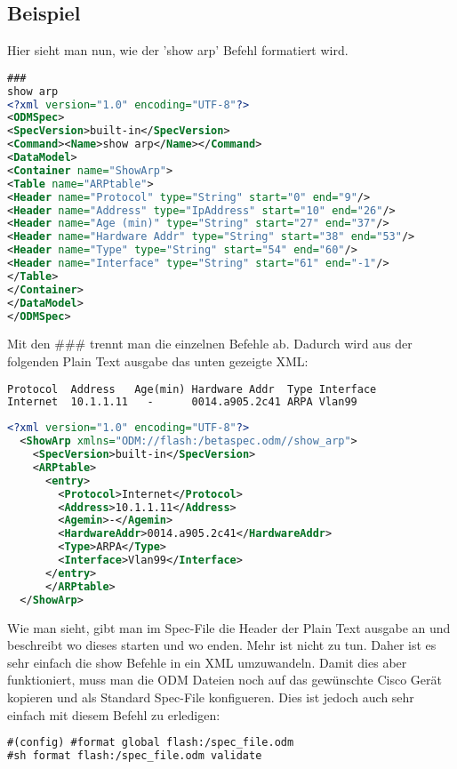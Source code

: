 \documentclass[a4,12pt]{scrartcl}
\begin{document}
\subsection{Beispiel}
Hier sieht man nun, wie der 'show arp' Befehl formatiert wird.\newline
\begin{lstlisting}[language=xml]
###
show arp
<?xml version="1.0" encoding="UTF-8"?>
<ODMSpec>
<SpecVersion>built-in</SpecVersion>
<Command><Name>show arp</Name></Command>
<DataModel>
<Container name="ShowArp">
<Table name="ARPtable">
<Header name="Protocol" type="String" start="0" end="9"/>
<Header name="Address" type="IpAddress" start="10" end="26"/>
<Header name="Age (min)" type="String" start="27" end="37"/>
<Header name="Hardware Addr" type="String" start="38" end="53"/>
<Header name="Type" type="String" start="54" end="60"/>
<Header name="Interface" type="String" start="61" end="-1"/>
</Table>
</Container>
</DataModel>
</ODMSpec>
\end{lstlisting}
Mit den \#\#\# trennt man die einzelnen Befehle ab.\newline\newline
Dadurch wird aus der folgenden Plain Text ausgabe das unten gezeigte XML:\newline
\begin{lstlisting}[language=xml]
Protocol  Address   Age(min) Hardware Addr  Type Interface
Internet  10.1.1.11   -      0014.a905.2c41 ARPA Vlan99
\end{lstlisting}
\begin{lstlisting}[language=xml]
<?xml version="1.0" encoding="UTF-8"?>
  <ShowArp xmlns="ODM://flash:/betaspec.odm//show_arp">
    <SpecVersion>built-in</SpecVersion>
    <ARPtable>
      <entry>
        <Protocol>Internet</Protocol>
        <Address>10.1.1.11</Address>
        <Agemin>-</Agemin>
        <HardwareAddr>0014.a905.2c41</HardwareAddr>
        <Type>ARPA</Type>
        <Interface>Vlan99</Interface>
      </entry>
      </ARPtable>
  </ShowArp>
\end{lstlisting}

Wie man sieht, gibt man im Spec-File die Header der Plain Text ausgabe an und beschreibt wo dieses starten und wo enden. Mehr ist nicht zu tun. Daher ist es sehr einfach die show Befehle in ein XML umzuwandeln.\newline
Damit dies aber funktioniert, muss man die ODM Dateien noch auf das gewünschte Cisco Gerät kopieren und als Standard Spec-File konfigueren. Dies ist jedoch auch sehr einfach mit diesem Befehl zu erledigen:\newline
\begin{lstlisting}[language=xml]
#(config) #format global flash:/spec_file.odm
#sh format flash:/spec_file.odm validate
\end{lstlisting}
\newpage
\end{document}
